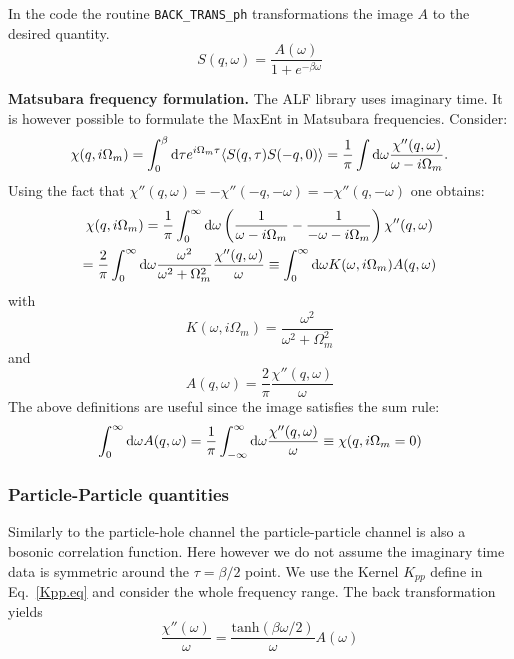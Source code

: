 In the code the routine \texttt{BACK\_TRANS\_ph}   transformations the image $A$ to the desired quantity.
\begin{equation}
	S(q,\omega) = \frac{A(\omega)}{1 + e^{-\beta \omega} }  
\end{equation}

\noindent
\textbf{Matsubara frequency formulation.}
The ALF  library uses  imaginary time. It is however possible to formulate the MaxEnt in  Matsubara frequencies.
Consider:
\begin{equation}
  \chi(q,i\Omega_m) = \int_0^{\beta} {\text d} \tau  e^{i \Omega_m \tau}
	\langle S(q,\tau) S(-q,0) \rangle  = \frac{1}{\pi}
   \int {\text d} \omega  \frac{\chi''(q,\omega)}{ \omega - i \Omega_m }.
\end{equation}
Using the fact that $\chi''(q,\omega) = -\chi''(-q,-\omega) = -\chi''(q,-\omega)$ one obtains:
\begin{equation}
\begin{gathered}
  \chi(q,i\Omega_m) = 
	\frac{1}{\pi}
   \int_0^{\infty} {\text d} \omega \left(\frac{1}{ \omega - i \Omega_m } - \frac{1}{ -\omega - i \Omega_m } \right)
         \chi''(q,\omega) \\
    = \frac{2}{\pi} \int_0^{\infty} {\text d} \omega \frac{\omega^2}{ \omega^2  + \Omega_m^2 } 
  \frac{\chi''(q,\omega)}{\omega} 
   \equiv \int_0^{\infty} {\text d} \omega K(\omega,i\Omega_m) A(q,\omega)
\end{gathered}
\end{equation}
with
\begin{equation}
   K(\omega,i\Omega_m) = \frac{\omega^2}{ \omega^2  + \Omega_m^2 } 
\end{equation}
and
\begin{equation}
A(q,\omega) =  \frac{2}{\pi}   \frac{\chi''(q,\omega)}{\omega} 
\end{equation}
The above definitions are useful since the image satisfies the sum rule:
\begin{equation}
\int_0^{\infty} {\text d} \omega A(q,\omega) =  \frac{1}{\pi}  \int_{-\infty}^{\infty} {\text d} \omega 
   \frac{\chi''(q,\omega)}{\omega}   \equiv \chi(q,i\Omega_m=0)
\end{equation}


\subsubsection{Particle-Particle quantities}

Similarly to the particle-hole channel  the particle-particle channel is also a bosonic correlation function. Here however we do not assume the 
imaginary time data is symmetric around   the $\tau = \beta/2$ point.  We use the Kernel $K_{pp}$ define in Eq.~\ref{Kpp.eq}  and consider the whole frequency range. 
The back transformation  yields
\begin{equation}
 \frac{\chi''(\omega)} {\omega}   = \frac{\text{tanh} \left( \beta \omega/2 \right) }{ \omega }   A(\omega) 
\end{equation}



